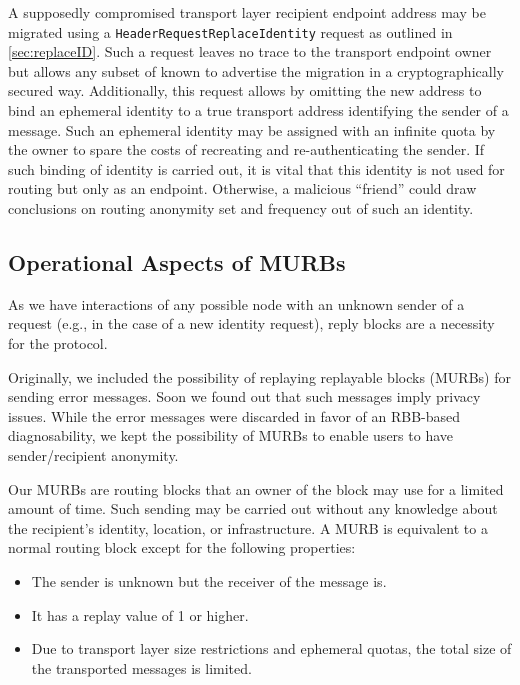 A supposedly compromised transport layer recipient endpoint address may be migrated using a \texttt{HeaderRequestReplaceIdentity} request as outlined in \cref{sec:replaceID}. Such a request leaves no trace to the transport endpoint owner but allows any subset of known \VortexNode{} to advertise the migration in a cryptographically secured way. Additionally, this request allows by omitting the new address to bind an ephemeral identity to a true transport address identifying the sender of a message. Such an ephemeral identity may be assigned with an infinite quota by the owner to spare the costs of recreating and re-authenticating the sender. If such binding of identity is carried out, it is vital that this identity is not used for routing but only as an endpoint. Otherwise, a malicious ``friend'' could draw conclusions on routing anonymity set and frequency out of such an identity.

\subsection{Operational Aspects of MURBs\label{sec:murb}}
As we have interactions of any possible node with an unknown sender of a request (e.g., in the case of a new identity request), reply blocks are a necessity for the \MessageVortex{} protocol.

Originally, we included the possibility of replaying replayable blocks (MURBs) for sending error messages. Soon we found out that such messages imply privacy issues. While the error messages were discarded in favor of an RBB-based diagnosability, we kept the possibility of MURBs to enable users to have sender/recipient anonymity. 

Our MURBs are routing blocks that an owner of the block may use for a limited amount of time. Such sending may be carried out without any knowledge about the recipient's identity, location, or infrastructure. A MURB is equivalent to a normal routing block except for the following properties:

\begin{itemize}
	\item The sender is unknown but the receiver of the message is.
	\item It has a replay value of 1 or higher.
	\item Due to transport layer size restrictions and ephemeral quotas, the total size of the transported messages is limited.
\end{itemize}


